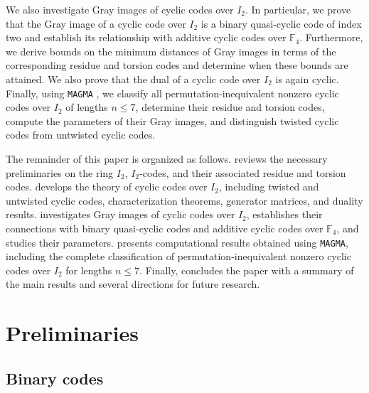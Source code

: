 \documentclass[12pt]{article}
\theoremstyle{definition}
\theoremstyle{plain}
\begin{document}
We also investigate Gray images of cyclic codes over $I_2$. In particular, we prove that the Gray image of a cyclic code over $I_2$ is a binary quasi-cyclic code of index two and establish its relationship with additive cyclic codes over $\mathbb F_4$. Furthermore, we derive bounds on the minimum distances of Gray images in terms of the corresponding residue and torsion codes and determine when these bounds are attained. We also prove that the dual of a cyclic code over $I_2$ is again cyclic. Finally, using \texttt{MAGMA} \cite{MAGMA}, we classify all permutation-inequivalent nonzero cyclic codes over $I_2$ of lengths $n\le7$, determine their residue and torsion codes, compute the parameters of their Gray images, and distinguish twisted cyclic codes from untwisted cyclic codes.

The remainder of this paper is organized as follows.  reviews the necessary preliminaries on the ring $I_2$, $I_2$-codes, and their associated residue and torsion codes.  develops the theory of cyclic codes over $I_2$, including twisted and untwisted cyclic codes, characterization theorems, generator matrices, and duality results.  investigates Gray images of cyclic codes over $I_2$, establishes their connections with binary quasi-cyclic codes and additive cyclic codes over $\mathbb F_4$, and studies their parameters.  presents computational results obtained using \texttt{MAGMA}, including the complete classification of permutation-inequivalent nonzero cyclic codes over $I_2$ for lengths $n\le7$. Finally,  concludes the paper with a summary of the main results and several directions for future research.





\section{Preliminaries}  \label{sec:prelim}


\subsection{Binary codes}
\end{document}
